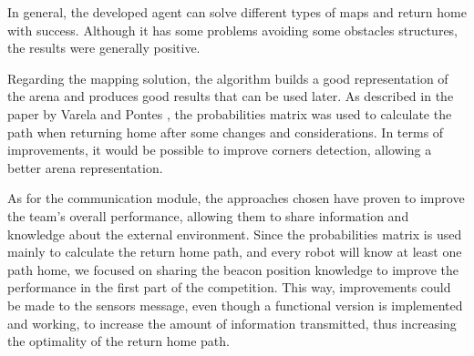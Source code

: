 \documentclass[oribibl]{llncs}
\begin{document}
In general, the developed agent can solve different types of maps and return home with success. Although it has some problems avoiding some obstacles structures, the results were generally positive.

Regarding the mapping solution, the algorithm builds a good representation of the arena and produces good results that can be used later. As described in the paper by  Varela and Pontes \cite{varelaepontes}, the probabilities matrix was used to calculate the path when returning home after some changes and considerations. In terms of improvements, it would be possible to improve corners detection, allowing a better arena representation.

As for the communication module, the approaches chosen have proven to improve the team's overall performance, allowing them to share information and knowledge about the external environment. Since the probabilities matrix is used mainly to calculate the return home path, and every robot will know at least one path home, we focused on sharing the beacon position knowledge to improve the performance in the first part of the competition. This way, improvements could be made to the sensors message, even though a functional version is implemented and working, to increase the amount of information transmitted, thus increasing the optimality of the return home path.




\end{document}
